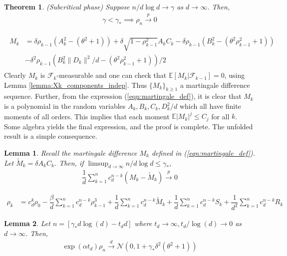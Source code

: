 \documentclass[10pt,a4paper]{amsart}
\newtheorem{lemma}{Lemma}
\newtheorem{theorem}{Theorem}
\newcommand{\E}{\mathbb{E}}
\def\gF{{\mathcal{F}}}
\def\gN{{\mathcal{N}}}
\begin{document}
\begin{theorem}\label{thm:subcritical}(Subcritical phase)
    Suppose $n/d\log d\to \gamma$ as $d\to\infty$. Then,
    \begin{align*}
        \gamma<\gamma_*\implies \rho_n\stackrel{p}{\to}0
    \end{align*}
\end{theorem}

\begin{align}\label{eqn:martingale_def}
\begin{split}
    M_k &= \delta\rho_{k-1}(A_k^2-(\theta^2+1))+\delta\sqrt{1-\rho^2_{k-1}}A_kC_k-\delta\rho_{k-1}(B_k^2-(\theta^2\rho_{k-1}^2+1))\\
    &-\delta^2\rho_{k-1}(B_k^2\|D_k\|^2/d-(\theta^2\rho_{k-1}^2+1))/2
\end{split}
\end{align}Clearly $M_k$ is $\gF_k$-measurable and one can check that $\E[M_k|\gF_{k-1}]=0$, using Lemma \ref{lemma:Xk_components_indep}. Thus $\{M_k\}_{k\geq 1}$ a martingale difference sequence. Further, from the expression (\ref{eqn:martingale_def}), it is clear that $M_k$ is a polynomial in the random variables $A_k,B_k,C_k,D_k^2/d$ which all have finite moments of all orders. This implies that each moment $\E|M_k|^j\leq C_j$ for all $k$. Some algebra yields the final expression, and the proof is complete. The unfolded result is a simple consequence.

\begin{lemma}\label{lemma:martingale_simplified}
    Recall the martingale difference $M_k$ defined in (\ref{eqn:martingale_def}). Let $\tilde M_k=\delta A_kC_k$. Then, if $\limsup_{d\to\infty} n/d\log d\leq \gamma_*$,
    \begin{align*}
        \dfrac{1}{d}\sum_{k=1}^n c_d^{n-k}(M_k-\tilde M_k)\stackrel{p}{\to}0
    \end{align*}
\end{lemma}

\begin{align}\label{eqn:recursion_unfolded_final_simplified}
    \rho_k &= c_d^k\rho_0 - \dfrac{\beta}{d}\sum_{k=1}^n c_d^{n-k}\rho^3_{k-1} + \dfrac{1}{d}\sum_{k=1}^n c_d^{n-k}\tilde M_k + \dfrac{1}{d}\sum_{k=1}^n c_d^{n-k}S_k + \dfrac{1}{d^2}\sum_{k=1}^n c_d^{n-k}R_k
\end{align}

\begin{lemma}\label{lemma:exact_behavior_rho_subcritical}
    Let $n=[\gamma_*d\log(d)-t_dd]$ where $t_d\to\infty,t_d/\log(d)\to0$ as $d\to\infty$. Then,
    \begin{align*}
        \exp(\alpha t_d)\rho_n\stackrel{d}{\to}\gN(0, 1+\gamma_*\delta^2(\theta^2+1))
    \end{align*}
\end{lemma}
\end{document}
